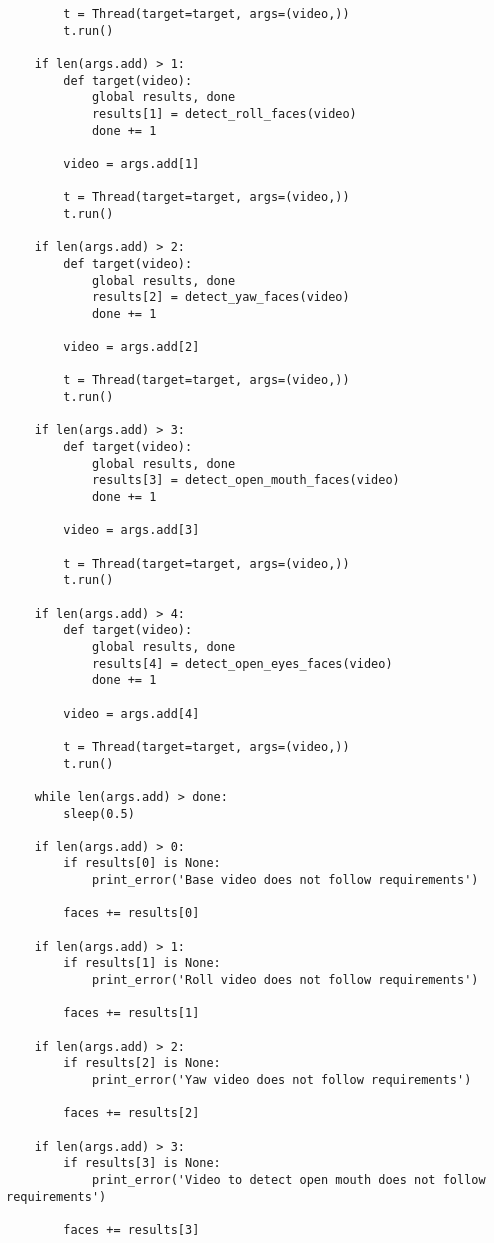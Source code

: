 \begin{verbatim}
        t = Thread(target=target, args=(video,))
        t.run()

    if len(args.add) > 1:
        def target(video):
            global results, done
            results[1] = detect_roll_faces(video)
            done += 1

        video = args.add[1]

        t = Thread(target=target, args=(video,))
        t.run()

    if len(args.add) > 2:
        def target(video):
            global results, done
            results[2] = detect_yaw_faces(video)
            done += 1

        video = args.add[2]

        t = Thread(target=target, args=(video,))
        t.run()

    if len(args.add) > 3:
        def target(video):
            global results, done
            results[3] = detect_open_mouth_faces(video)
            done += 1

        video = args.add[3]

        t = Thread(target=target, args=(video,))
        t.run()

    if len(args.add) > 4:
        def target(video):
            global results, done
            results[4] = detect_open_eyes_faces(video)
            done += 1

        video = args.add[4]

        t = Thread(target=target, args=(video,))
        t.run()

    while len(args.add) > done:
        sleep(0.5)

    if len(args.add) > 0:
        if results[0] is None:
            print_error('Base video does not follow requirements')

        faces += results[0]

    if len(args.add) > 1:
        if results[1] is None:
            print_error('Roll video does not follow requirements')

        faces += results[1]

    if len(args.add) > 2:
        if results[2] is None:
            print_error('Yaw video does not follow requirements')

        faces += results[2]

    if len(args.add) > 3:
        if results[3] is None:
            print_error('Video to detect open mouth does not follow requirements')

        faces += results[3]


\end{verbatim}
